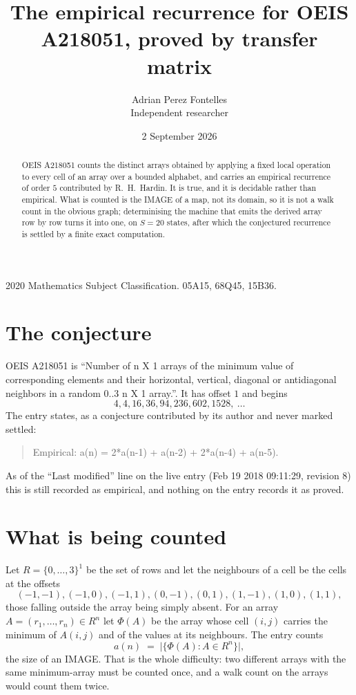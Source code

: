 \documentclass[11pt,a4paper]{article}
\title{The empirical recurrence for OEIS A218051, proved by transfer matrix}
\author{Adrian Perez Fontelles\\ \small Independent researcher}
\date{2 September 2026}
\theoremstyle{plain}
\theoremstyle{definition}
\begin{document}
\maketitle

\begin{abstract}
OEIS A218051 counts the distinct arrays obtained by applying a fixed local operation to every cell
of an array over a bounded alphabet, and carries an empirical recurrence of order $5$
contributed by R.~H.~Hardin. It is true, and it is decidable rather than empirical. What is
counted is the IMAGE of a map, not its domain, so it is not a walk count in the obvious graph;
determinising the machine that emits the derived array row by row turns it into one, on
$S=20$ states, after which the conjectured recurrence is settled by a finite exact
computation.
\end{abstract}

\noindent\small 2020 Mathematics Subject Classification. 05A15, 68Q45, 15B36.\normalsize

\section{The conjecture}

OEIS A218051 is ``Number of n X 1 arrays of the minimum value of corresponding elements and their horizontal, vertical, diagonal or antidiagonal neighbors in a random 0..3 n X 1 array.''. It has offset $1$ and begins
\[
4, 4, 16, 36, 94, 236, 602, 1528,\ \dots
\]
The entry states, as a conjecture contributed by its author and never marked settled:
\begin{quote}
Empirical: a(n) = 2*a(n-1) + a(n-2) + 2*a(n-4) + a(n-5).
\end{quote}
As of the ``Last modified'' line on the live entry (Feb 19 2018 09:11:29, revision 8) this is still
recorded as empirical, and nothing on the entry records it as proved.

\section{What is being counted}

Let $R=\{0,\dots,3\}^{1}$ be the set of rows and let the neighbours of
a cell be the cells at the offsets
\[
(-1,-1), (-1,0), (-1,1), (0,-1), (0,1), (1,-1), (1,0), (1,1),
\]
those falling outside the array being simply absent. For an array
$A=(r_1,\dots,r_n)\in R^n$ let $\Phi(A)$ be the array whose cell $(i,j)$ carries the
minimum of $A(i,j)$ and of the values at its neighbours. The entry counts
\[
a(n)\;=\;\bigl|\{\Phi(A):A\in R^n\}\bigr| ,
\]
the size of an IMAGE. That is the whole difficulty: two different arrays with the same
minimum-array must be counted once, and a walk count on the arrays would count them twice.
\end{document}
